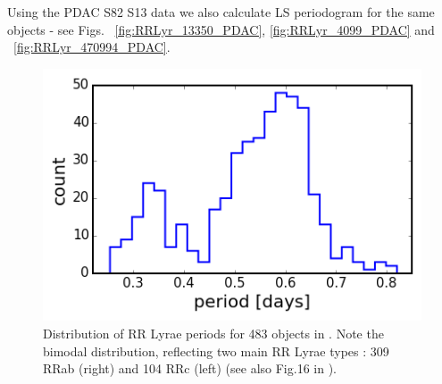 \documentclass[DM,lsstdraft,toc]{lsstdoc}
\begin{document}
Using the PDAC S82 S13 data  we also calculate LS periodogram for the same objects -  see Figs. ~\ref{fig:RRLyr_13350_PDAC}, \ref{fig:RRLyr_4099_PDAC} and ~\ref{fig:RRLyr_470994_PDAC}.









\begin{figure}
\begin{centering}
\includegraphics[width=0.7\columnwidth]{figs/Fig_1_Sesar_2010_RRLyr}
\caption{ Distribution of RR Lyrae periods  for 483 objects in \citep{2010ApJ...708..717S}. Note the bimodal distribution, reflecting two main RR Lyrae types : 309 RRab (right) and 104 RRc (left) (see also Fig.16 in \citep{2010ApJ...708..717S}).}
\label{fig:RRLyr_distribution}
\end{centering}
\end{figure}
\end{document}
